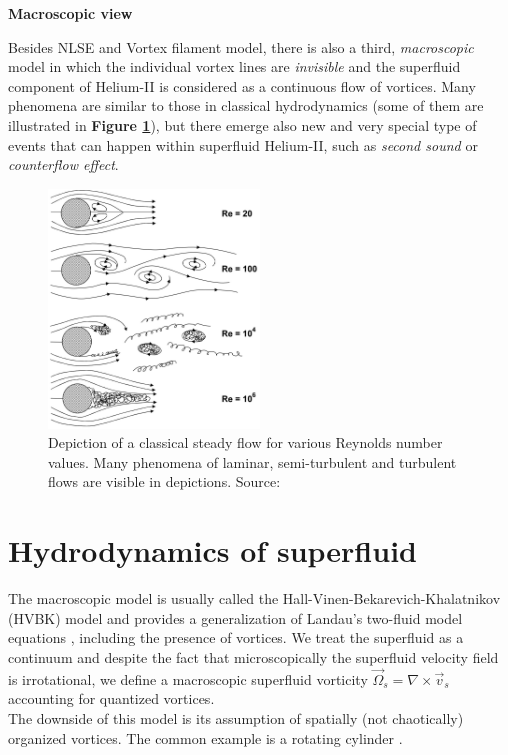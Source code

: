 {\Huge \bfseries Macroscopic view}
\vspace{0.3cm}

Besides NLSE and Vortex filament model, there is also a third, \textit{macroscopic} model in which the individual vortex lines are \textit{invisible} and the superfluid component of Helium-II is considered as a continuous flow of vortices. Many phenomena are similar to those in classical hydrodynamics (some of them are illustrated in \textbf{Figure \ref{laminar-turbulent}}), but there emerge also new and very special type of events that can happen within superfluid Helium-II, such as \textit{second sound} or \textit{counterflow effect}.

\begin{figure}[h]
	\centering
	\includegraphics[width=0.5\textwidth]{graphics/theory/laminar-turbulent}
	\caption{Depiction of a classical steady flow for various Reynolds number values. Many phenomena of laminar, semi-turbulent and turbulent flows are visible in depictions. Source:\cite{laminar-turbulence}}
	\label{laminar-turbulent}
\end{figure}


\section{Hydrodynamics of superfluid}

The macroscopic model is usually called the Hall-Vinen-Bekarevich-Khalatnikov (HVBK) model and provides a generalization of Landau's two-fluid model equations \cite{landau}, including the presence of vortices. We treat the superfluid as a continuum and despite the fact that microscopically the superfluid velocity field is irrotational, we define a macroscopic superfluid vorticity $\vec{\Omega}_s = \nabla \times \vec{v}_s$ accounting for quantized vortices.\\
The downside of this model is its assumption of spatially (not chaotically) organized vortices. The common example is a rotating cylinder \cite{osborne}.\\

